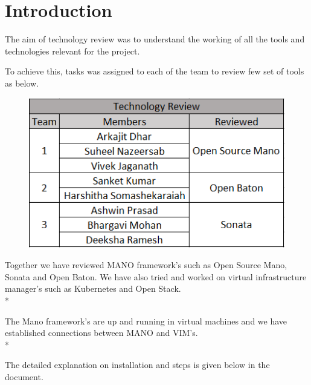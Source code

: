 \chapter{Introduction}
\label{ch:Introduction}

The aim of technology review was to understand the working of all the tools and technologies relevant for the project.

To achieve this, tasks was assigned to each of the team to review few set of tools as below. 

\begin{figure} [h]
\centering
\includegraphics[width=.5\linewidth]{figures/teams}
\end{figure}

Together we have reviewed MANO framework's such as Open Source Mano, Sonata and Open Baton. We have also tried and worked on virtual infrastructure manager's such as Kubernetes and Open Stack.\\*

The Mano framework's are up and running in virtual machines and we have established connections between MANO and VIM's.\\*

The detailed explanation on installation and steps is given below in the document.



